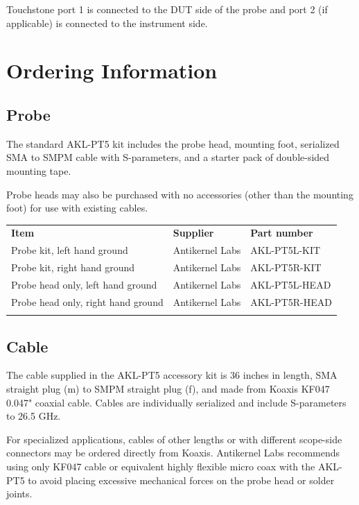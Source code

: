 \documentclass[11pt]{article}
\newcommand{\thinhline}{\Xhline{1\arrayrulewidth}}
\newcommand{\thickhline}{\Xhline{2.5\arrayrulewidth}}
\begin{document}
Touchstone port 1 is connected to the DUT side of the probe and port 2 (if applicable) is connected to the instrument
side.


\pagebreak
\section{Ordering Information}
\label{ordering-info}

\subsection{Probe}

The standard AKL-PT5 kit includes the probe head, mounting foot, serialized SMA to SMPM cable with S-parameters, and a
starter pack of double-sided mounting tape.

Probe heads may also be purchased with no accessories (other than the mounting foot) for use with existing cables.

\begin{tabularx}{16cm}{llX}
\thickhline
\textbf{Item} & \textbf{Supplier} & \textbf{Part number} \\
\thickhline
Probe kit, left hand ground & Antikernel Labs & AKL-PT5L-KIT \\
\thinhline
Probe kit, right hand ground & Antikernel Labs & AKL-PT5R-KIT \\
\thinhline
Probe head only, left hand ground & Antikernel Labs & AKL-PT5L-HEAD \\
\thinhline
Probe head only, right hand ground & Antikernel Labs & AKL-PT5R-HEAD \\
\thickhline
\end{tabularx}

\subsection{Cable}

The cable supplied in the AKL-PT5 accessory kit is 36 inches in length, SMA straight plug (m) to SMPM straight plug
(f), and made from Koaxis KF047 0.047" coaxial cable. Cables are individually serialized and include S-parameters to
26.5 GHz.

For specialized applications, cables of other lengths or with different scope-side connectors may be ordered directly
from Koaxis. Antikernel Labs recommends using only KF047 cable or equivalent highly flexible micro coax with the
AKL-PT5 to avoid placing excessive mechanical forces on the probe head or solder joints.
\end{document}

